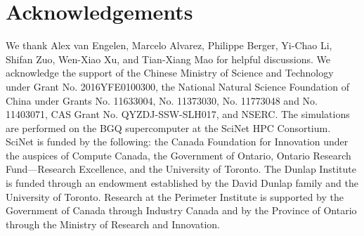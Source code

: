 \documentclass[prd,superscriptaddress,floatfix,notitlepage,nofootinbib,reprint]{revtex4-1}
\begin{document}
\section*{Acknowledgements}
We thank Alex van Engelen, Marcelo Alvarez, Philippe Berger, 
Yi-Chao Li, Shifan Zuo, Wen-Xiao Xu, and Tian-Xiang Mao for helpful discussions.
We acknowledge the support of the Chinese Ministry of Science and Technology
under Grant No. 2016YFE0100300, the National Natural Science Foundation of 
China under Grants No. 11633004, No. 11373030, No. 11773048 and No. 11403071, 
CAS Grant No. QYZDJ-SSW-SLH017, and NSERC.
The simulations are performed on the BGQ supercomputer at the SciNet HPC 
Consortium. SciNet is funded by the following: the Canada Foundation for 
Innovation under 
the auspices of Compute Canada, the Government of Ontario, Ontario Research 
Fund---Research Excellence, and the University of Toronto.
The Dunlap Institute is funded through an endowment established by the David Dunlap family and the University of Toronto.
Research at the Perimeter Institute is supported by the Government of Canada 
through Industry Canada and by the Province of Ontario through the Ministry of 
Research and Innovation.



\end{document}
